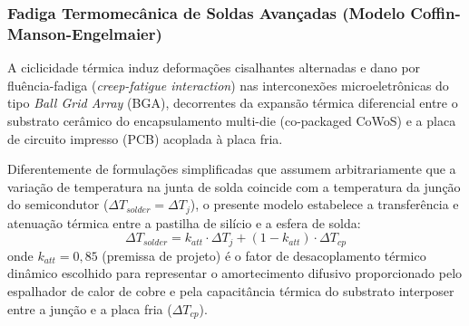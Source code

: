 \subsubsection{Fadiga Termomecânica de Soldas Avançadas (Modelo Coffin-Manson-Engelmaier)}

A ciclicidade térmica induz deformações cisalhantes alternadas e dano por fluência-fadiga (\textit{creep-fatigue interaction}) nas interconexões microeletrônicas do tipo \textit{Ball Grid Array} (BGA), decorrentes da expansão térmica diferencial entre o substrato cerâmico do encapsulamento multi-die (co-packaged CoWoS) e a placa de circuito impresso (PCB) acoplada à placa fria. 

Diferentemente de formulações simplificadas que assumem arbitrariamente que a variação de temperatura na junta de solda coincide com a temperatura da junção do semicondutor ($\Delta T_{solder} = \Delta T_j$), o presente modelo estabelece a transferência e atenuação térmica entre a pastilha de silício e a esfera de solda:
\begin{equation}
    \Delta T_{solder} = k_{att} \cdot \Delta T_j + (1 - k_{att}) \cdot \Delta T_{cp}
    \label{eq:atenuacao_termica_solda}
\end{equation}
onde $k_{att} = 0{,}85$ (premissa de projeto) é o fator de desacoplamento térmico dinâmico escolhido para representar o amortecimento difusivo proporcionado pelo espalhador de calor de cobre e pela capacitância térmica do substrato interposer entre a junção e a placa fria ($\Delta T_{cp}$).

